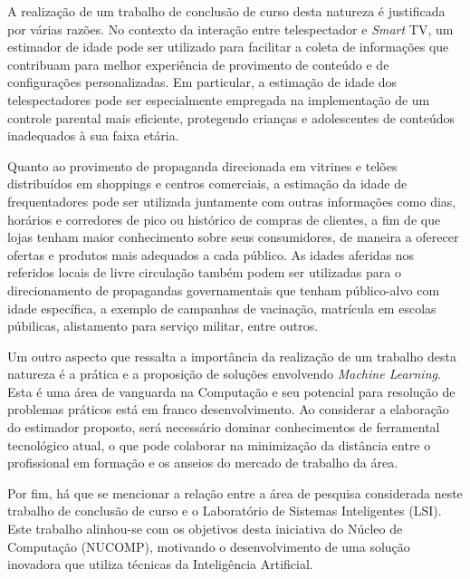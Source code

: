 A realização de um trabalho de conclusão de curso desta natureza é justificada por várias razões. No contexto da interação entre telespectador e \emph{Smart} TV, um estimador de idade pode ser utilizado para facilitar a coleta de informações que contribuam para melhor experiência de provimento de conteúdo e de configurações personalizadas. Em particular, a estimação de idade dos telespectadores pode ser especialmente empregada na implementação de um controle parental mais eficiente, protegendo crianças e adolescentes de conteúdos inadequados à sua faixa etária.

Quanto ao provimento de propaganda direcionada em vitrines e telões distribuídos em shoppings e centros comerciais, a estimação da idade de frequentadores pode ser utilizada juntamente com outras informações como dias, horários e corredores de pico ou histórico de compras de clientes, a fim de que lojas tenham maior conhecimento sobre seus consumidores, de maneira a oferecer ofertas e produtos mais adequados a cada público. As idades aferidas nos referidos locais de livre circulação também podem ser utilizadas para o direcionamento de propagandas governamentais que tenham público-alvo com idade específica, a exemplo de campanhas de vacinação, matrícula em escolas púbilicas, alistamento para serviço militar, entre outros.

Um outro aspecto que ressalta a importância da realização de um trabalho desta natureza é a prática e a proposição de soluções envolvendo \emph{Machine Learning}. Esta é uma área de vanguarda na Computação e seu potencial para resolução de problemas práticos está em franco desenvolvimento. Ao considerar a elaboração do estimador proposto, será necessário dominar conhecimentos de ferramental tecnológico atual, o que pode colaborar na minimização da distância entre o profissional em formação e os anseios do mercado de trabalho da área.

Por fim, há que se mencionar a relação entre a área de pesquisa considerada neste trabalho de conclusão de curso e o Laboratório de Sistemas Inteligentes (LSI). Este trabalho alinhou-se com os objetivos desta iniciativa do Núcleo de Computação (NUCOMP), motivando o desenvolvimento de uma solução inovadora que utiliza técnicas da Inteligência Artificial.
